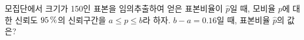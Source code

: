 모집단에서 크기가 150인 표본을 임의추출하여 얻은 표본비율이 $\hat{p}$일 때, 모비율 $p$에 대한 신뢰도 $95\mkern3mu \%$의 신뢰구간을 $a\le p\le b$라 하자. $b-a=0.16$일 때, 표본비율 $\hat{p}$의 값은? 
